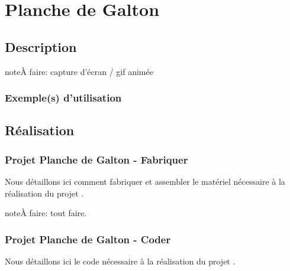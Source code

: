 \documentclass[letterpaper,10pt,french]{sphinxmanual}
\begin{document}


\section{Planche de Galton}
\label{\detokenize{projets/galton:planche-de-galton}}\label{\detokenize{projets/galton::doc}}\label{\detokenize{projets/galton:projetgalton}}

\subsection{Description}
\label{\detokenize{projets/galton:description}}
\begin{sphinxadmonition}{note}{\label{projets/galton:index-0}À faire:}
capture d’écran / gif animée
\end{sphinxadmonition}


\subsubsection{Exemple(s) d’utilisation}
\label{\detokenize{projets/galton:exemple-s-d-utilisation}}

\subsection{Réalisation}
\label{\detokenize{projets/galton:realisation}}

\subsubsection{Projet Planche de Galton - Fabriquer}
\label{\detokenize{projets/galton-fabriquer:projet-projetgalton-fabriquer}}\label{\detokenize{projets/galton-fabriquer::doc}}
Nous détaillons ici comment fabriquer et assembler
le matériel nécessaire à la réalisation du projet
{\hyperref[\detokenize{projets/galton:projetgalton}]{}}.

\begin{sphinxadmonition}{note}{\label{projets/galton-fabriquer:index-0}À faire:}
tout faire.
\end{sphinxadmonition}


\subsubsection{Projet Planche de Galton - Coder}
\label{\detokenize{projets/galton-coder:projet-projetgalton-coder}}\label{\detokenize{projets/galton-coder::doc}}
Nous détaillons ici le code nécessaire à la réalisation
du projet {\hyperref[\detokenize{projets/galton:projetgalton}]{}}.
\end{document}
